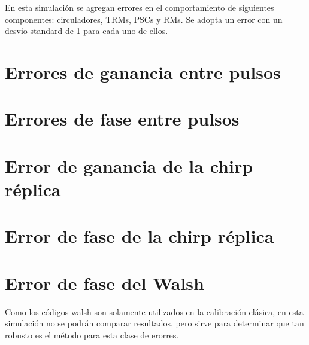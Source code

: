 En esta simulación se agregan errores en el comportamiento de siguientes componentes: circuladores, TRMs, PSCs y RMs. Se adopta
un error con un desvío standard de 1 para cada uno de ellos.

\section{Errores de ganancia entre pulsos}
\section{Errores de fase entre pulsos}
\section{Error de ganancia de la chirp réplica}
\section{Error de fase de la chirp réplica}
\section{Error de fase del Walsh}

Como los códigos walsh son solamente utilizados en la calibración clásica, en esta simulación no se podrán comparar 
resultados, pero sirve para determinar que tan robusto es el método para esta clase de erorres.

